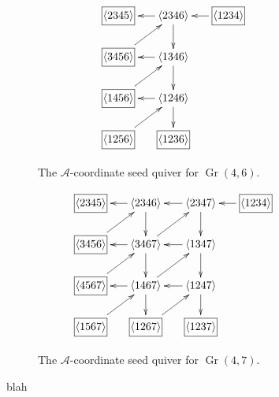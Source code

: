 \documentclass[11pt]{article}
\DeclareMathOperator{\Gr}{Gr}
\def\ket#1{\langle #1 \rangle}
\def\a{\mathcal{A}}
\begin{document}
\begin{figure}
\centering
\begin{subfigure}[b]{0.45\textwidth}
\begin{equation*}
\begin{gathered}
\begin{xy} 0;<-.5pt,0pt>:<0pt,-.5pt>::
         (-100,0) *+{\framebox[7ex]{$\ket{1234}$}} ="0",
	(0,0) *+{\ket{2346}} ="1",
	(100,0) *+{\framebox[7ex]{$\ket{2345}$}} ="2",
	(0,75) *+{\ket{1346}} ="3",
	(100,75) *+{\framebox[7ex]{$\ket{3456}$}} ="4",
	(0,150) *+{\ket{1246}} ="5",
	(100,150) *+{\framebox[7ex]{$\ket{1456}$}} ="6",
	(0,225) *+{\framebox[7ex]{$\ket{1236}$}} ="7",
	(100,225) *+{\framebox[7ex]{$\ket{1256}$}} ="8",
	"0", {\ar"1"},
	"1", {\ar"2"},
	"3", {\ar"4"},
	"5", {\ar"6"},
	"1", {\ar"3"},
	"3", {\ar"5"},
	"5", {\ar"7"},
	"4", {\ar"1"},
	"6", {\ar"3"},
	"8", {\ar"5"},
\end{xy}
\end{gathered} 
\end{equation*}
\caption{The $\a$-coordinate seed quiver for $\Gr(4,6)$.} \label{fig:g46-seed}
\end{subfigure}
\hspace*{\fill} 
\begin{subfigure}[b]{0.45\textwidth}
\begin{equation*}
\begin{gathered}
\begin{xy} 0;<-.5pt,0pt>:<0pt,-.5pt>::
         (-100,0) *+{\framebox[7ex]{$\ket{1234}$}} ="0",
	(0,0) *+{\ket{2347}} ="1",
	(100,0) *+{\ket{2346}} ="2",
	(200,0) *+{\framebox[7ex]{$\ket{2345}$}} ="3",
	(0,75) *+{\ket{1347}} ="4",
	(100,75) *+{\ket{3467}} ="5",
	(200,75) *+{\framebox[7ex]{$\ket{3456}$}} ="6",
	(0,150) *+{\ket{1247}} ="7",
	(100,150) *+{\ket{1467}} ="8",
	(200,150) *+{\framebox[7ex]{$\ket{4567}$}} ="9",
	(0,225) *+{\framebox[7ex]{$\ket{1237}$}} ="10",
	(100,225) *+{\framebox[7ex]{$\ket{1267}$}} ="11",
	(200,225) *+{\framebox[7ex]{$\ket{1567}$}} ="12",
	"0", {\ar"1"},
	"1", {\ar"2"},
	"2", {\ar"3"},
	"4", {\ar"5"},
	"5", {\ar"6"},
	"7", {\ar"8"},
	"8", {\ar"9"},
	"1", {\ar"4"},
	"2", {\ar"5"},
	"4", {\ar"7"},
	"5", {\ar"8"},
	"7", {\ar"10"},
	"8", {\ar"11"},
	"5", {\ar"1"},
	"6", {\ar"2"},
	"8", {\ar"4"},
	"9", {\ar"5"},
	"11", {\ar"7"},
	"12", {\ar"8"},
\end{xy}
\end{gathered} 
\end{equation*}
\caption{The $\a$-coordinate seed quiver for $\Gr(4,7)$.} \label{fig:g47-seed}
\end{subfigure}
\caption{blah} 
\end{figure}
\end{document}
